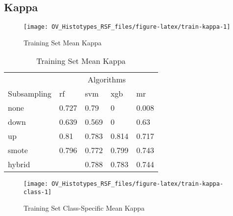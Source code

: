\documentclass[
]{report}
\begin{document}
\subsection{Kappa}\label{kappa-1}

\begin{figure}[H]

{\centering \texttt{[image: OV\_Histotypes\_RSF\_files/figure-latex/train-kappa-1]} 

}

\caption{Training Set Mean Kappa}\label{fig:train-kappa}
\end{figure}

\begin{table}

\caption{\label{tab:train-kappa-table}Training Set Mean Kappa}
\centering
\begin{tabular}[t]{l|l|l|l|l}
\hline
\multicolumn{1}{c|}{ } & \multicolumn{4}{c}{Algorithms} \\
\cline{2-5}
Subsampling & rf & svm & xgb & mr\\
\hline
none & 0.727 & 0.79 & 0 & 0.008\\
\hline
down & 0.639 & 0.569 & 0 & 0.63\\
\hline
up & 0.81 & 0.783 & 0.814 & 0.717\\
\hline
smote & 0.796 & 0.772 & 0.799 & 0.743\\
\hline
hybrid & \cellcolor[HTML]{90ee90}{0.819} & 0.788 & 0.783 & 0.744\\
\hline
\end{tabular}
\end{table}

\begin{figure}[H]

{\centering \texttt{[image: OV\_Histotypes\_RSF\_files/figure-latex/train-kappa-class-1]} 

}

\caption{Training Set Class-Specific Mean Kappa}\label{fig:train-kappa-class}
\end{figure}
\end{document}
